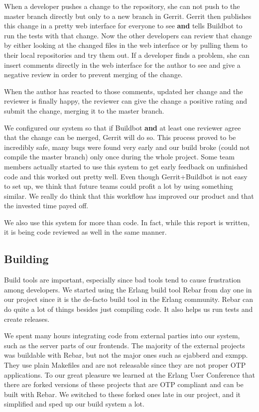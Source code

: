 \documentclass[11pt,a4paper]{report}
\begin{document}
When a developer pushes a change to the repository, she can not push to the
master branch directly but only to a new branch in Gerrit. Gerrit then publishes
this change in a pretty web interface for everyone to see {\bf and} tells
Buildbot to run the tests with that change. Now the other developers can review
that change by either looking at the changed files in the web interface or by
pulling them to their local repositories and try them out. If a developer finds
a problem, she can insert comments directly in the web interface for the author
to see and give a negative review in order to prevent merging of the change.

When the author has reacted to those comments, updated her change and the
reviewer is finally happy, the reviewer can give the change a positive rating
and submit the change, merging it to the master branch.

We configured our system so that if Buildbot {\bf and} at least one reviewer
agree that the change can be merged, Gerrit will do so. This process proved to
be incredibly safe, many bugs were found very early and our build broke (could
not compile the master branch) only once during the whole project. Some team
members actually started to use this system to get early feedback on unfinished
code and this worked out pretty well. Even though Gerrit+Buildbot is not easy to
set up, we think that future teams could profit a lot by using something
similar. We really do think that this workflow has improved our product and that
the invested time payed off.

We also use this system for more than code. In fact, while this report is
written, it is being code reviewed as well in the same manner.
\subsection{Building}
Build tools are important, especially since bad tools tend to cause frustration
among developers. We started using the Erlang build tool Rebar from day one in
our project since it is the de-facto build tool in the Erlang community. Rebar
can do quite a lot of things besides just compiling code. It also helps us run
tests and create releases.

We spent many hours integrating code from external parties into our system, such
as the server parts of our frontends. The majority of the external projects was
buildable with Rebar, but not the major ones such as ejabberd and exmpp. They
use plain Makefiles and are not releasable since they are not proper OTP
applications. To our great pleasure we learned at the Erlang User Conference
that there are forked versions of these projects that are OTP compliant and can
be built with Rebar. We switched to these forked ones late in our project, and
it simplified and sped up our build system a lot.
\end{document}
